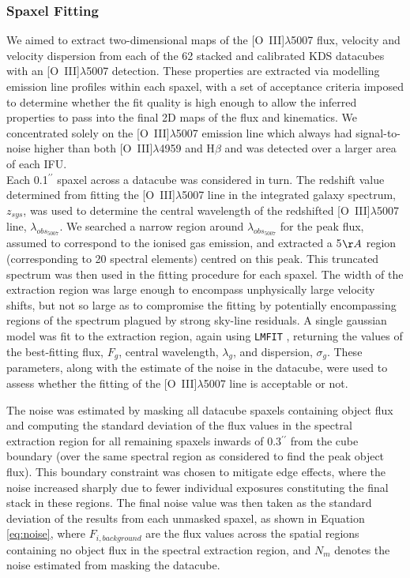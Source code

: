 \documentclass[fleqn,usenatbib]{mnras}
\begin{document}
\subsubsection{Spaxel Fitting}\label{subsubsection:spaxel_fitting}
We aimed to extract two-dimensional maps of the [O~{\sc III}]$\lambda$5007 flux, velocity and velocity dispersion from each of the 62 stacked and calibrated KDS datacubes with an [O~{\sc III}]$\lambda$5007 detection.
These properties are extracted via modelling emission line profiles within each spaxel, with a set of acceptance criteria imposed to determine whether the fit quality is high enough to allow the inferred properties to pass into the final 2D maps of the flux and kinematics.
We concentrated solely on the [O~{\sc III}]$\lambda$5007 emission line which always had signal-to-noise higher than both [O~{\sc III}]$\lambda$4959 and H$\beta$ and was detected over a larger area of each IFU. \\

\noindent
Each 0.1$^{\prime\prime}$ spaxel across a datacube was considered in turn.
The redshift value determined from fitting the [O~{\sc III}]$\lambda$5007 line in the integrated galaxy spectrum, $z_{sys}$, was used to determine the central wavelength of the redshifted [O~{\sc III}]$\lambda$5007 line, $\lambda_{obs_{5007}}$. 
We searched a narrow region around $\lambda_{obs_{5007}}$ for the peak flux, assumed to correspond to the ionised gas emission, and extracted a 5$\AA$ region (corresponding to 20 spectral elements) centred on this peak.
This truncated spectrum was then used in the fitting procedure for each spaxel.
The width of the extraction region was large enough to encompass unphysically large velocity shifts, but not so large as to compromise the fitting by potentially encompassing regions of the spectrum plagued by strong sky-line residuals.
A single gaussian model was fit to the extraction region, again using {\tt LMFIT} \citep{Newville2014}, returning the values of the best-fitting flux, $F_{g}$, central wavelength, $\lambda_{g}$, and dispersion, $\sigma_{g}$.
These parameters, along with the estimate of the noise in the datacube, were used to assess whether the fitting of the [O~{\sc III}]$\lambda$5007 line is acceptable or not. 

The noise was estimated by masking all datacube spaxels containing object flux and computing the standard deviation of the flux values in the spectral extraction region for all remaining spaxels inwards of 0.3$^{\prime\prime}$ from the cube boundary (over the same spectral region as considered to find the peak object flux).
This boundary constraint was chosen to mitigate edge effects, where the noise increased sharply due to fewer individual exposures constituting the final stack in these regions.
The final noise value was then taken as the standard deviation of the results from each unmasked spaxel, as shown in Equation \ref{eq:noise}, where $F_{i,background}$ are the flux values across the spatial regions containing no object flux in the spectral extraction region, and $N_{m}$ denotes the noise estimated from masking the datacube.
\end{document}
